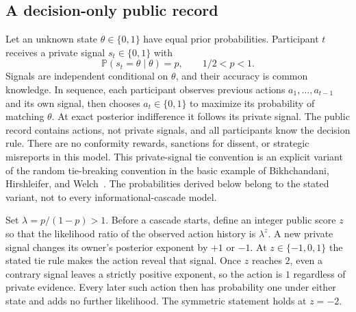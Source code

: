 \documentclass[11pt,letterpaper]{article}
\theoremstyle{plain}
\theoremstyle{definition}
\theoremstyle{remark}
\newcommand{\Prob}{\mathbb P}
\begin{document}
\subsection{A decision-only public record}
Let an unknown state $\theta\in\{0,1\}$ have equal prior probabilities. Participant $t$ receives a private signal $s_t\in\{0,1\}$ with
\[
\Prob(s_t=\theta\mid\theta)=p,\qquad 1/2<p<1.
\]
Signals are independent conditional on $\theta$, and their accuracy is common knowledge. In sequence, each participant observes previous actions $a_1,\ldots,a_{t-1}$ and its own signal, then chooses $a_t\in\{0,1\}$ to maximize its probability of matching $\theta$. At exact posterior indifference it follows its private signal. The public record contains actions, not private signals, and all participants know the decision rule. There are no conformity rewards, sanctions for dissent, or strategic misreports in this model. This private-signal tie convention is an explicit variant of the random tie-breaking convention in the basic example of Bikhchandani, Hirshleifer, and Welch~\cite{bikhchandani1992}. The probabilities derived below belong to the stated variant, not to every informational-cascade model.

Set $\lambda=p/(1-p)>1$. Before a cascade starts, define an integer public score $z$ so that the likelihood ratio of the observed action history is $\lambda^z$. A new private signal changes its owner's posterior exponent by $+1$ or $-1$. At $z\in\{-1,0,1\}$ the stated tie rule makes the action reveal that signal. Once $z$ reaches $2$, even a contrary signal leaves a strictly positive exponent, so the action is $1$ regardless of private evidence. Every later such action then has probability one under either state and adds no further likelihood. The symmetric statement holds at $z=-2$.
\end{document}
